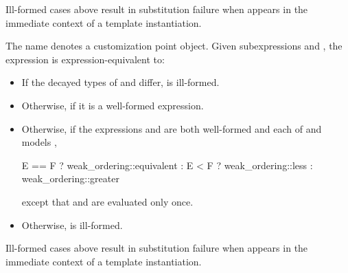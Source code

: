 \begin{note}
Ill-formed cases above result in substitution failure
when  appears in the immediate context
of a template instantiation.
\end{note}

%
\pnum
The name  denotes
a customization point object.
Given subexpressions  and ,
the expression 
is expression-equivalent to:
\begin{itemize}
\item
  If the decayed types of  and  differ,
   is ill-formed.
\item
  Otherwise,  if it is a well-formed expression.
\item
  Otherwise, if the expressions  and 
  are both well-formed and
  each of  and  models
  ,
\begin{codeblock}
E == F ? weak_ordering::equivalent :
E < F  ? weak_ordering::less :
         weak_ordering::greater
\end{codeblock}
except that  and  are evaluated only once.
\item
  Otherwise,  is ill-formed.
\end{itemize}

\begin{note}
Ill-formed cases above result in substitution failure
when  appears in the immediate context
of a template instantiation.
\end{note}

